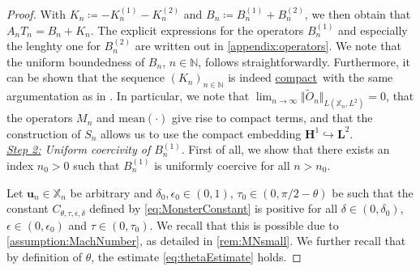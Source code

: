 \documentclass{m2an}
\renewcommand{\u}{\mathbf{u}}
\newcommand{\Xn}{\mathbb{X}_n}
\newcommand{\bH}{{\mathbf H}}
\newcommand{\bL}{\mathbf{L}}
\newcommand{\N}{\mathbb{N}}
\newcommand{\seq}[1]{(#1_n)_{n \in \mathbb{N}}}
\newcommand{\Sol}{S_n}
\newcommand\compactop{\hyperlink{compactop}{compact}}
\newcommand{\BnI}{B_n^{(1)}}
\newcommand{\BnII}{B_n^{(2)}}
\newcommand{\KnI}{K_n^{(1)}}
\newcommand{\KnII}{K_n^{(2)}}
\theoremstyle{plain}
\theoremstyle{definition}
\begin{document}
\begin{proof}
   With $K_n \coloneqq - \KnI - \KnII$ and $B_n \coloneqq \BnI + \BnII$, we then obtain that $A_n T_n = B_n + K_n$. The explicit expressions for the operators $\BnI$ and especially the lenghty one for $\BnII$ are written out in \cref{appendix:operators}.
   We note that the uniform boundedness of $B_n$, $n \in \N$, follows straightforwardly. Furthermore, it can be shown that the sequence $\seq{K}$ is indeed \compactop~with the same argumentation as in \cite[Lem.~17]{H23Hdiv}. In particular, we note that $\lim_{n \to \infty} \Vert \tilde{O}_n \Vert_{L(\Xn,L^2)} = 0$, that the operators $M_n$ and $\text{mean}(\cdot)$ give rise to compact terms, and that the construction of $\Sol$ allows us to use the compact embedding $\bH^1 \hookrightarrow \bL^2$. \\[0.8ex]
   \emph{\underline{Step 2:} Uniform coercivity of $\BnI$}. 
   First of all, we show that there exists an index $n_0 > 0$ such that $\BnI$ is uniformly coercive for all $n > n_0$.
   
   Let $\u_n \in \Xn$ be arbitrary and $\delta_0, \epsilon_0 \in (0,1)$, $\tau_0 \in (0,\pi/2-\theta)$ be such that the constant $C_{\theta,\tau,\epsilon,\delta}$ defined by \eqref{eq:MonsterConstant} is positive for all $\delta \in (0,\delta_0)$, $\epsilon \in (0,\epsilon_0)$ and $\tau \in (0,\tau_0)$. We recall that this is possible due to \cref{assumption:MachNumber}, as detailed in \cref{rem:MNsmall}. We further recall that by definition of $\theta$, the estimate \eqref{eq:thetaEstimate} holds. 


\end{proof}
\end{document}
